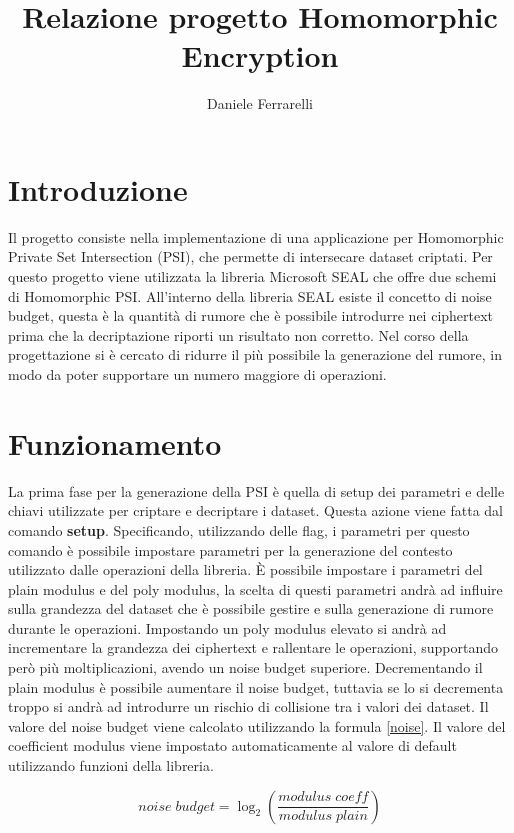 \documentclass[]{article}
\title{Relazione progetto Homomorphic Encryption}
\author{Daniele Ferrarelli}
\date{}
\begin{document}
\maketitle

\section{Introduzione}
Il progetto consiste nella implementazione di una applicazione per  Homomorphic Private Set Intersection (PSI), che permette di intersecare dataset criptati. Per questo progetto viene utilizzata la libreria Microsoft SEAL che offre due schemi di Homomorphic PSI.
All'interno della libreria SEAL esiste il concetto di noise budget, questa è la quantità di rumore che è possibile introdurre nei ciphertext prima che la decriptazione riporti un risultato non corretto. Nel corso della progettazione si è cercato di ridurre il più possibile la generazione del rumore, in modo da poter supportare un numero maggiore di operazioni.

\section{Funzionamento}
La prima fase per la generazione della PSI è quella di setup dei parametri e delle chiavi utilizzate per criptare e decriptare i dataset. Questa azione viene fatta dal comando \textbf{setup}. Specificando, utilizzando delle flag, i parametri per questo comando è possibile impostare parametri per la generazione del contesto utilizzato dalle operazioni della libreria. È possibile impostare i parametri del plain modulus e del poly modulus, la scelta di questi parametri andrà ad influire sulla grandezza del dataset che è possibile gestire e sulla generazione di rumore durante le operazioni. Impostando un poly modulus elevato si andrà ad incrementare la grandezza dei ciphertext e rallentare le operazioni, supportando però più moltiplicazioni, avendo un noise budget superiore. Decrementando il plain modulus è possibile aumentare il noise budget, tuttavia se lo si decrementa troppo si andrà ad introdurre un rischio di collisione tra i valori dei dataset. Il valore del noise budget viene calcolato utilizzando la formula \ref{noise}. Il valore del coefficient modulus viene impostato automaticamente al valore di default utilizzando funzioni della libreria.

\begin{equation}\label{noise}
	noise\;budget = \log_2(\frac{modulus\;coe\!f\!f}{modulus\;plain})
\end{equation}
\end{document}
